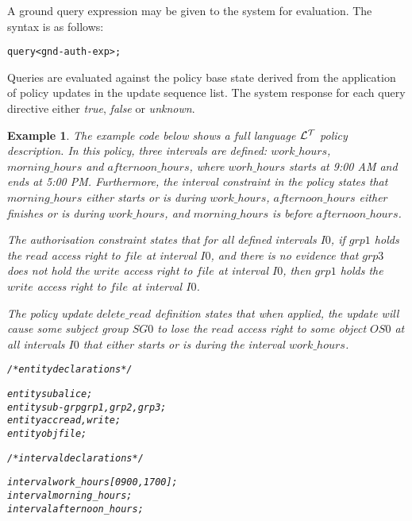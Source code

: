 \documentclass[11pt]{report}
\newtheorem{vexample}{Example}[chapter]
\newenvironment{vverbatim}
{
  \begin{alltt}
}
{
    \vspace{-\baselineskip}
  \end{alltt}
}
\begin{document}
          A ground query expression may be given to the system for evaluation.
          The syntax is as follows:

          \begin{vverbatim}
  query <gnd-auth-exp>;
          \end{vverbatim}

          Queries are evaluated against the policy base state derived from the
          application of policy updates in the update sequence list. The system
          response for each query directive either {\em true}, {\em false} or
          {\em unknown}.

        \begin{vexample}
          \label{exam-tempo-syntx}
          The example code below shows a full language ${\cal L^T}$ policy
          description. In this policy, three intervals are defined:
          $work\_hours$, $morning\_hours$ and $afternoon\_hours$, where
          $worh\_hours$ starts at 9:00 AM and ends at 5:00 PM. Furthermore,
          the interval constraint in the policy states that $morning\_hours$
          either {\em starts} or is {\em during} $work\_hours$,
          $afternoon\_hours$ either {\em finishes} or is {\em during}
          $work\_hours$, and $morning\_hours$ is {\em before}
          $afternoon\_hours$.

          The authorisation constraint states that for all defined intervals
          $I0$, if $grp1$ holds the $read$ access right to $file$ at interval
          $I0$, and there is no evidence that $grp3$ does not hold the $write$
          access right to $file$ at interval $I0$, then $grp1$ holds the
          $write$ access right to $file$ at interval $I0$.

          The policy update $delete\_read$ definition states that when applied,
          the update will cause some subject group $SG0$ to lose the $read$
          access right to some object $OS0$ at all intervals $I0$ that either
          {\em starts} or is {\em during} the interval $work\_hours$.

          \begin{vverbatim}
  /* entity declarations */

  entity sub alice;
  entity sub-grp grp1, grp2, grp3;
  entity acc read, write;
  entity obj file;

  /* interval declarations */

  interval work\_hours [0900, 1700];
  interval morning\_hours;
  interval afternoon\_hours;


\end{vverbatim}
\end{vexample}
\end{document}
